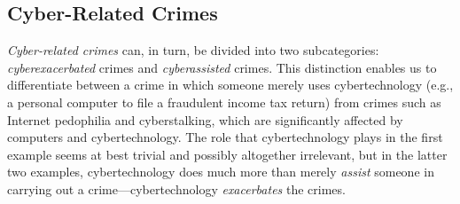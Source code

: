 \documentclass[12pt]{article}
\theoremstyle{definition}
\begin{document}
\subsection{Cyber-Related Crimes}
\textit{Cyber-related crimes} can, in turn, be divided into two subcategories: \textit{cyberexacerbated} crimes and \textit{cyberassisted} crimes. This distinction enables us to differentiate between a crime in which someone merely uses cybertechnology (e.g., a personal computer to file a fraudulent
income tax return) from crimes such as Internet pedophilia and cyberstalking, which are
significantly affected by computers and cybertechnology. The role that cybertechnology
plays in the first example seems at best trivial and possibly altogether irrelevant, but in the
latter two examples, cybertechnology does much more than merely \textit{assist} someone in
carrying out a crime—cybertechnology \textit{exacerbates} the crimes.
\end{document}
